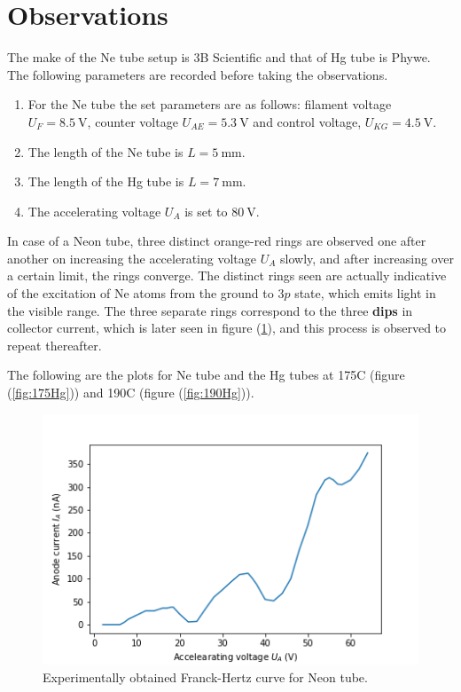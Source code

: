 \documentclass[%
 reprint,
 amsmath,amssymb,
 aps,
]{revtex4-2}
\begin{document}
    
\section{Observations}
    The make of the Ne tube setup is 3B Scientific and that of Hg tube is Phywe. The following parameters are recorded before taking the observations.
    \begin{enumerate}
        \item For the Ne tube the set parameters are as follows: filament voltage $U_F = \SI{8.5}{\volt}$, counter voltage $U_{AE} = \SI{5.3}{\volt}$ and control voltage, $U_{KG} = \SI{4.5}{\volt}$.
        \item The length of the Ne tube is $L = \SI{5}{\milli \metre}$.
        \item The length of the Hg tube is $L = \SI{7}{\milli \metre}$.
        \item The accelerating voltage $U_A$ is set to $\SI{80}{\volt}$.
    \end{enumerate}
    In case of a Neon tube, three distinct orange-red rings are observed one after another on increasing the accelerating voltage $U_A$ slowly, and after increasing over a certain limit, the rings converge. The distinct rings seen are actually indicative of the excitation of Ne atoms from the ground to 3$p$ state, which emits light in the visible range. The three separate rings correspond to the three \textbf{dips} in collector current, which is later seen in figure (\ref{fig:neonPlot}), and this process is observed to repeat thereafter.
    \par
    The following are the plots for Ne tube and the Hg tubes at 175\degree C (figure (\ref{fig:175Hg})) and 190\degree C (figure (\ref{fig:190Hg})).
    \begin{figure}[htp]
        \centering
        \includegraphics[scale = 0.5]{Figures/NeonPlot.png}
        \caption{Experimentally obtained Franck-Hertz curve for Neon tube.}
        \label{fig:neonPlot}
    \end{figure}
\end{document}
